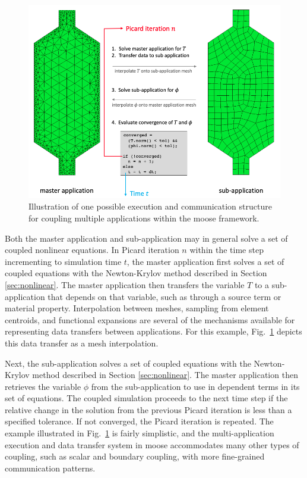 \begin{figure}[!h]
\centering
\includegraphics[width=0.9\linewidth]{figs/multiapp.png}
\caption{Illustration of one possible execution and communication structure for coupling multiple applications within the \gls{moose} framework.}
\label{fig:multiapp}
\end{figure}

Both the master application and sub-application may in general solve a set of coupled nonlinear equations. In Picard iteration \(n\) within the time step incrementing to simulation time \(t\), the master application first solves a set of coupled equations with the Newton-Krylov method described in Section \ref{sec:nonlinear}. The master application then transfers the variable \(T\) to a sub-application that depends on that variable, such as through a source term or material property. Interpolation between meshes, sampling from element centroids, and functional expansions are several of the mechanisms available for representing data transfers between applications. For this example, Fig.\ \ref{fig:multiapp} depicts this data transfer as a mesh interpolation. 

Next, the sub-application solves a set of coupled equations with the Newton-Krylov method described in Section \ref{sec:nonlinear}. The master application then retrieves the variable \(\phi\) from the sub-application to use in dependent terms in its set of equations. The coupled simulation proceeds to the next time step if the relative change in the solution from the previous Picard iteration is less than a specified tolerance. If not converged, the Picard iteration is repeated. The example illustrated in Fig.\ \ref{fig:multiapp} is fairly simplistic, and the multi-application execution and data transfer system in \gls{moose} accommodates many other types of coupling, such as scalar and boundary coupling, with more fine-grained communication patterns. 

